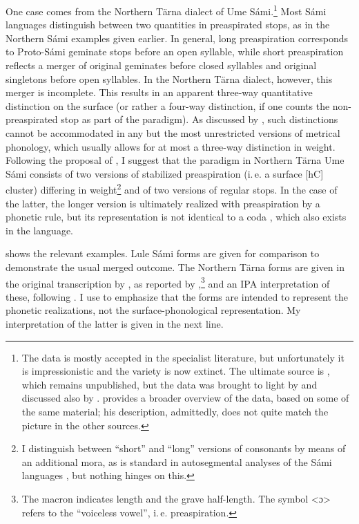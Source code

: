 \documentclass[output=paper,colorlinks,citecolor=brown]{langscibook}
\begin{document}
One case comes from the Northern Tärna dialect of Ume Sámi.\footnote{The data is mostly accepted in the specialist literature, but unfortunately it is impressionistic and the variety is now extinct. The ultimate source is \textcite{moosberg1920stadieväxlingen}, which remains unpublished, but the data was brought to light by \textcite{bergsland1973simplification} and discussed also by \textcite{sammallahti1998saami, sammallahti2012subglottal, bye2001virtual}. \Textcite{larsson2012grenzen} provides a broader overview of the data, based on some of the same material; his description, admittedly, does not quite match the picture in the other sources.} Most Sámi languages distinguish between two quantities in preaspirated stops, as in the Northern Sámi examples given earlier. In general, long preaspiration corresponds to Proto\hyp Sámi geminate stops before an open syllable, while short preaspiration reflects a merger of original geminates before closed syllables and original singletons before open syllables. In the Northern Tärna dialect, however, this merger is incomplete.  This results in an apparent three\hyp way quantitative distinction on the surface (or rather a four\hyp way distinction, if one counts the non\hyp preaspirated stop as part of the paradigm). As discussed by \textcite{bye2001virtual}, such distinctions cannot be accommodated in any but the most unrestricted versions of metrical phonology, which usually allows for at most a three\hyp way distinction in weight. Following the proposal of \textcite[132]{bye2001virtual}, I suggest that the paradigm in Northern Tärna Ume Sámi consists of two versions of stabilized preaspiration (i.\,e. a surface [hC] cluster) differing in weight\footnote{I distinguish between \enquote{short} and \enquote{long} versions of consonants by means of an additional mora, as is standard in autosegmental analyses of the Sámi languages \parencite{bye2001virtual, bye2005coda, bals2012north}, but nothing hinges on this.} and of two versions of regular stops. In the case of the latter, the longer version is ultimately realized with preaspiration by a phonetic rule, but its representation is not identical to a coda \ipa{[h]}, which also exists in the language.

\largerpage
{} shows the relevant examples. Lule Sámi forms are given for comparison to demonstrate the usual merged outcome. The Northern Tärna forms are given in the original transcription by \textcite{moosberg1920stadieväxlingen}, as reported by  ,\footnote{The macron indicates length and the grave half\hyp length. The symbol <ɔ> refers to the \enquote{voiceless vowel}, i.\,e. preaspiration.} and an IPA interpretation of these, following \textcite[132]{bye2001virtual}. I use  to emphasize that the forms are intended to represent the phonetic realizations, not the surface\hyp phonological representation. My interpretation of the latter is given in the next line.
\end{document}
